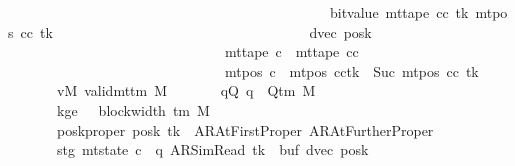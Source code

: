 \begin{isabellebody}
\ \ \ \ \ \ \ \ \ \ \ \ \ \ \ \ \ \ \ \ \ \ \ \ \ \ \ \ \ \ \ \ \ \ \ \ \ \ \ \ \ \ \ \ \ {\isacharplus}{\kern0pt}\ bit{\isacharunderscore}{\kern0pt}value\ {\isacharparenleft}{\kern0pt}mt{\isacharunderscore}{\kern0pt}tape\ cc\ tk\ {\isacharparenleft}{\kern0pt}mt{\isacharunderscore}{\kern0pt}pos\ cc\ tk{\isacharparenright}{\kern0pt}{\isacharparenright}{\kern0pt}{\isacharparenright}{\kern0pt}{\isacharparenright}{\kern0pt}{\isacharcomma}{\kern0pt}\isanewline
\ \ \ \ \ \ \ \ \ \ \ \ \ \ \ \ \ \ \ \ \ \ \ \ \ \ \ \ \ \ \ \ \ \ \ \ dvec{\isacharcomma}{\kern0pt}\ posk{\isacharparenright}{\kern0pt}\isanewline
\ \ \ \ \ \ \ \ \ \ \ \ \ \ \ \ \ \ \ \ \ \ \ \ \ \ \ \ \ \ {\isasymand}\ mt{\isacharunderscore}{\kern0pt}tape\ c{\isacharprime}{\kern0pt}{\isacharprime}{\kern0pt}\ {\isacharequal}{\kern0pt}\ mt{\isacharunderscore}{\kern0pt}tape\ cc\isanewline
\ \ \ \ \ \ \ \ \ \ \ \ \ \ \ \ \ \ \ \ \ \ \ \ \ \ \ \ \ \ {\isasymand}\ mt{\isacharunderscore}{\kern0pt}pos\ c{\isacharprime}{\kern0pt}{\isacharprime}{\kern0pt}\ {\isacharequal}{\kern0pt}\ {\isacharparenleft}{\kern0pt}mt{\isacharunderscore}{\kern0pt}pos\ cc{\isacharparenright}{\kern0pt}{\isacharparenleft}{\kern0pt}tk\ {\isacharcolon}{\kern0pt}{\isacharequal}{\kern0pt}\ Suc\ {\isacharparenleft}{\kern0pt}mt{\isacharunderscore}{\kern0pt}pos\ cc\ tk{\isacharparenright}{\kern0pt}{\isacharparenright}{\kern0pt}{\isachardoublequoteclose}\isanewline
\ \ \ \ \ \ \ vM{\isacharcolon}{\kern0pt}\ {\isachardoublequoteopen}valid{\isacharunderscore}{\kern0pt}mttm\ M{\isachardoublequoteclose}\isanewline
\ \ \ \ \ \ \ qQ{\isacharcolon}{\kern0pt}\ {\isachardoublequoteopen}q\ {\isasymin}\ Q{\isacharunderscore}{\kern0pt}tm\ M{\isachardoublequoteclose}\isanewline
\ \ \ \ \ \ \ kge{}{\isacharcolon}{\kern0pt}\ {\isachardoublequoteopen}{}\ {\isasymle}\ block{\isacharunderscore}{\kern0pt}width\ {\isacharparenleft}{\kern0pt}{\isasymGamma}{\isacharunderscore}{\kern0pt}tm\ M{\isacharparenright}{\kern0pt}{\isachardoublequoteclose}\isanewline
\ \ \ \ \ \ \ posk{\isacharunderscore}{\kern0pt}proper{\isacharcolon}{\kern0pt}\ {\isachardoublequoteopen}posk\ tk\ {\isasymin}\ {\isacharbraceleft}{\kern0pt}AR{\isacharunderscore}{\kern0pt}AtFirstProper{\isacharcomma}{\kern0pt}\ AR{\isacharunderscore}{\kern0pt}AtFurtherProper{\isacharbraceright}{\kern0pt}{\isachardoublequoteclose}\isanewline
\ \ \ \ \ \ \ stg{\isacharcolon}{\kern0pt}\ {\isachardoublequoteopen}mt{\isacharunderscore}{\kern0pt}state\ c{\isacharprime}{\kern0pt}\ {\isacharequal}{\kern0pt}\ {\isacharparenleft}{\kern0pt}q{\isacharcomma}{\kern0pt}\ AR{\isacharunderscore}{\kern0pt}SimRead{\isacharcomma}{\kern0pt}\ tk{\isacharcomma}{\kern0pt}\ {}{\isacharcomma}{\kern0pt}\ buf{}{\isacharcomma}{\kern0pt}\ dvec{\isacharcomma}{\kern0pt}\ posk{\isacharparenright}{\kern0pt}{\isachardoublequoteclose}\isanewline

\end{isabellebody}
